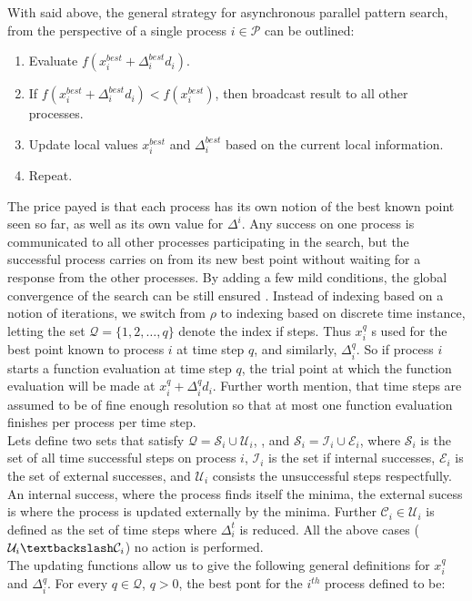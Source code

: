 
 With said above, the general strategy for asynchronous parallel pattern search, from the perspective of a single process $i\in\mathcal{P}$ can be outlined:
		\begin{enumerate}
		\item Evaluate $f(x^{best}_i+\Delta^{best}_id_i)$.
		\item If $f(x^{best}_i+\Delta^{best}_id_i) <f(x^{best}_i)$, then broadcast result to all other processes.
		\item Update local values $x^{best}_i$ and $\Delta^{best}_i$ based on the current local information.
		\item Repeat.
		\end{enumerate}
	The price payed is that each process has its own notion of the best known point seen so far, as well as its own value for	$\Delta^i$. Any success on one process is communicated to all other processes participating in the search, but the successful process carries on from its new best point without waiting for a response from the other processes. By adding a few mild conditions, the global convergence of the search can be still ensured \cite{kolda2003understanding}.  Instead of indexing based on a notion of iterations, we switch from $\rho$ to indexing based on discrete time instance, letting the set $\mathcal{Q}=\{1,2,\dots,q\}$ denote the index if steps. Thus $x_i^q$ s used for the best point known to process $i$ at time step $q$, and similarly, $\Delta_i^q$.  So if process $i$ starts a function evaluation at time step $q$, the trial point at which the function evaluation will be made at $x^{q}_i+\Delta^{q}_id_i$. Further worth mention, that time steps are assumed to be of fine enough resolution so that at most one function evaluation finishes per process per time step.\\
	Lets define two sets that satisfy $\mathcal{Q}=\mathcal{S}_i\cup\mathcal{U}_i$, , and $\mathcal{S}_i=\mathcal{I}_i\cup\mathcal{E}_i$, where $\mathcal{S}_i$ is the set of all time successful steps on process $i$, $\mathcal{I}_i$ is the set if internal successes, $\mathcal{E}_i$ is the set of external successes,   and $\mathcal{U}_i$ consists the unsuccessful steps respectfully. An internal success, where the process finds itself the minima, the external sucess is where the process is updated externally by the minima. Further  $\mathcal{C}_i\in\mathcal{U}_i$ is defined as the set of time steps where $\Delta^t_i$ is reduced. All the above cases ($\mathcal{U}_i\textbackslash\mathcal{C}_i$) no action is performed.\\
	The updating functions allow us to give the following general definitions for $x_i^q$ and $\Delta^q_i$. For every $q\in\mathcal{Q}$, $q>0$, the best pont for the $i^{th}$ process defined to be:
	
